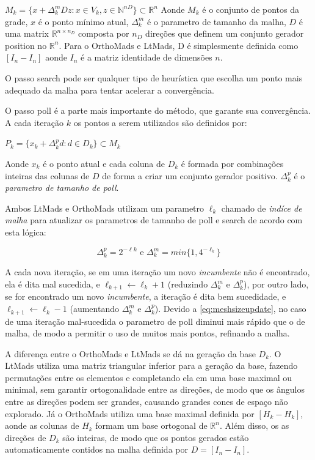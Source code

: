 $M_k = \{x + \Delta^m_kDz : x \in V_k, z \in \mathbb{N}^{nD} \} \subset \mathbb{R}^n$
Aonde $M_k$ é o conjunto de pontos da grade, $x$ é o ponto mínimo atual, $\Delta^m_k$ é o parametro de tamanho da malha, $D$ é uma matrix $\mathbb{R}^{n \times n_D}$ composta por $n_D$ direções que definem um conjunto gerador position no $\mathbb{R}^n$. Para o OrthoMads e LtMads, D é simplesmente definida como $[I_n -I_n]$ aonde $I_n$ é a matriz identidade de dimensões $n$.

O passo search pode ser qualquer tipo de heurística que escolha um ponto mais adequado da malha para tentar acelerar a convergência.

O passo poll é a parte mais importante do método, que garante sua convergência. A cada iteração $k$ os pontos a serem utilizados são definidos por:

\begin{center}
$P_k = \{ x_k + \Delta^p_kd : d \in D_k\} \subset M_k$
\end{center}

Aonde  $x_k$ é o ponto atual e cada coluna de $D_k$ é formada por combinações inteiras das colunas de $D$ de forma a criar um conjunto gerador positivo. $\Delta^p_k$ é o \textit{parametro de tamanho de poll}.

Ambos LtMads e OrthoMads utilizam um parametro $\ell_k$ chamado de \textit{indíce de malha} para atualizar os parametros de tamanho de poll e search de acordo com esta lógica:


\begin{equation} \label{eq:meshsizeupdate}
\Delta^p_k = 2^{-\ell k} \text{ e }  \Delta^m_k = min\{1, 4^{-\ell_k}\}
\end{equation}

A cada nova iteração, se em uma iteração um novo \textit{incumbente} não é encontrado, ela é dita mal sucedida, e $\ell_{k+1} \gets \ell_k +1$ (reduzindo $\Delta^m_k$ e $\Delta^p_k$), por outro lado, se for encontrado um novo \textit{incumbente}, a iteração é dita bem sucedidade, e $\ell_{k+1} \gets \ell_k -1$ (aumentando $\Delta^m_k$ e $\Delta^p_k$). Devido a \ref{eq:meshsizeupdate}, no caso de uma iteração mal-sucedida o parametro de poll diminui mais rápido que o de malha, de modo a permitir o uso de muitos mais pontos, refinando a malha.


A diferença entre o OrthoMads e LtMads se dá na geração da base $D_k$. O LtMads utiliza uma matriz triangular inferior para a geração da base, fazendo permutações entre os elementos e completando ela em uma base maximal ou minimal, sem garantir ortogonalidade entre as direções, de modo que os ângulos entre as direções podem ser grandes, causando grandes cones de espaço não explorado.
Já o OrthoMads utiliza uma base maximal definida por $[H_k -H_k]$, aonde as colunas de $H_k$ formam um base ortogonal de $\mathbb{R}^n$. Além disso, os as direções de $D_k$ são inteiras, de modo que os pontos gerados estão automaticamente contidos na malha definida por $D=[I_n -I_n]$.

